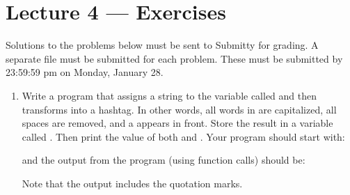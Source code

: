 \documentclass[letterpaper,10pt,english]{sphinxmanual}
\begin{document}
\chapter{Lecture 4 — Exercises}
\label{\detokenize{lecture_notes/lec04_modules_functions1_exercises/exercises:lecture-4-exercises}}\label{\detokenize{lecture_notes/lec04_modules_functions1_exercises/exercises::doc}}
Solutions to the problems below must be sent to Submitty for grading.
A separate file must be submitted for each problem. These must be
submitted by 23:59:59 pm on Monday, January 28.
\begin{enumerate}
\def\theenumi{\arabic{enumi}}
\def\labelenumi{\theenumi .}
\makeatletter\def\p@enumii{\p@enumi \theenumi .}\makeatother
\item {} 
Write a program that assigns a string to the variable called
 and then transforms  into a hashtag. In other
words, all words in  are capitalized, all spaces are
removed, and a \sphinxcode{\sphinxupquote{\#}} appears in front. Store the result in a
variable called . Then print the value of both
 and . Your program should start with:

\begin{sphinxVerbatim}[commandchars=\\\{\}]
  
\end{sphinxVerbatim}

and the output from the program (using  function
calls) should be:

\begin{sphinxVerbatim}[commandchars=\\\{\}]
  
   
\end{sphinxVerbatim}

Note that the output includes the quotation marks.


\end{enumerate}
\end{document}
